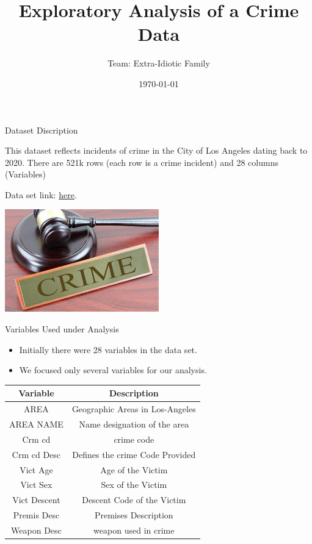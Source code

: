\documentclass{beamer}\usepackage[]{graphicx}\usepackage[]{xcolor}
\title{Exploratory Analysis of a Crime Data}  %
\author{Team: Extra-Idiotic Family}                              %
\institute{University of Nebraska-Lincoln}                  %
\date{\today}
\newenvironment{knitrout}{}{} %
\begin{document}
\begin{frame}
  \titlepage
\end{frame}

\begin{frame}{Dataset Discription}

This dataset reflects incidents of crime in the City of Los Angeles dating back to 2020. There are 521k rows (each row is a crime incident) and 28 columns (Variables)

Data set link: \href{https://data.lacity.org/Public-Safety/Crime-Data-from-2020-to-Present/2nrs-mtv8}{here}.



\begin{knitrout}
\color{fgcolor}
\includegraphics[width=0.5\textwidth]{figure/title.jpg}
\end{knitrout}
\end{frame}

\begin{frame}{Variables Used under Analysis}

\begin{itemize}
\item Initially there were 28 variables in the data set.
\item We focused only several variables for our analysis.
\end{itemize}



\begin{tabular}{|c||c|}
\hline
    Variable & Description \\ 
\hline
    AREA & Geographic Areas in Los-Angeles \\ 
\hline
    AREA NAME & Name designation of the area \\ 
\hline
Crm cd & crime code\\
\hline
Crm cd Desc & Defines the crime Code Provided\\
\hline
Vict Age & Age of the Victim\\
\hline
Vict Sex & Sex of the Victim\\
\hline
Vict Descent & Descent Code of the Victim\\
\hline
Premis Desc & Premises Description\\
\hline
Weapon Desc & weapon used in crime\\
\hline
\end{tabular}
\end{frame}
\end{document}
